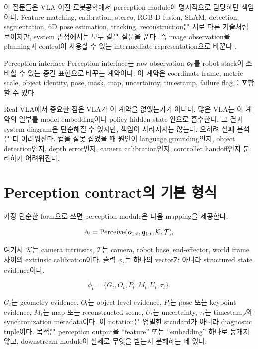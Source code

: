 이 질문들은 VLA 이전 로봇공학에서 perception module이 명시적으로 담당하던 책임이다. Feature matching, calibration, stereo, RGB-D fusion, SLAM, detection, segmentation, 6D pose estimation, tracking, reconstruction은 서로 다른 기술처럼 보이지만, system 관점에서는 모두 같은 질문을 푼다. 즉 image observation을 planning과 control이 사용할 수 있는 intermediate representation으로 바꾼다 \cite{hartley2004,lowe2004sift,murartal2015orbslam,ren2015fasterrcnn,he2017maskrcnn}.

\begin{definitionbox}{Perception interface}
Perception interface는 raw observation $\bm{o}_t$를 robot stack이 소비할 수 있는 중간 표현으로 바꾸는 계약이다. 이 계약은 coordinate frame, metric scale, object identity, pose, mask, map, uncertainty, timestamp, failure flag를 포함할 수 있다.
\end{definitionbox}

Real VLA에서 중요한 점은 VLA가 이 계약을 없앴는가가 아니다. 많은 VLA는 이 계약의 일부를 model embedding이나 policy hidden state 안으로 흡수한다. 그 결과 system diagram은 단순해질 수 있지만, 책임이 사라지지는 않는다. 오히려 실패 분석은 더 어려워진다. 컵을 잘못 집었을 때 원인이 language grounding인지, object detection인지, depth error인지, camera calibration인지, controller handoff인지 분리하기 어려워진다.

\section{Perception contract의 기본 형식}

가장 단순한 form으로 쓰면 perception module은 다음 mapping을 제공한다.

\begin{equation}
  \phi_t
  =
  \mathrm{Perceive}(\bm{o}_{1:t}, \bm{q}_{1:t}, \mathcal{K}, \mathcal{T}),
  \label{eq:perception-map}
\end{equation}

여기서 $\mathcal{K}$는 camera intrinsics, $\mathcal{T}$는 camera, robot base, end-effector, world frame 사이의 extrinsic calibration이다. 출력 $\phi_t$는 하나의 vector가 아니라 structured state evidence이다.

\begin{equation}
  \phi_t =
  \{G_t, O_t, P_t, M_t, U_t, \tau_t\}.
  \label{eq:perception-contract}
\end{equation}

$G_t$는 geometry evidence, $O_t$는 object-level evidence, $P_t$는 pose 또는 keypoint evidence, $M_t$는 map 또는 reconstructed scene, $U_t$는 uncertainty, $\tau_t$는 timestamp와 synchronization metadata이다. 이 notation은 엄밀한 standard가 아니라 diagnostic tuple이다. 목적은 perception output을 ``feature'' 또는 ``embedding'' 하나로 뭉개지 않고, downstream module이 실제로 무엇을 받는지 분해하는 데 있다.

